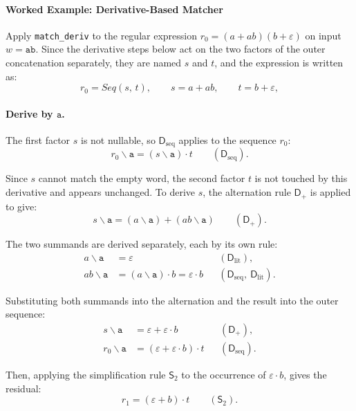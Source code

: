 \paragraph{Worked Example: Derivative-Based Matcher}
\label{sec:deriv-worked-example}

Apply \texttt{match\_deriv} to the regular expression
$r_0 = (a + ab)(b + \varepsilon)$ 
on input $w = \mathtt{ab}$. 
Since the derivative steps below act on the two factors 
of the outer concatenation separately, 
they are named $s$ and $t$, and the expression is written as:
\[
r_0 = \mathit{Seq}(s,\, t),
\qquad
s = a + ab,
\qquad
t = b + \varepsilon,
\]

\paragraph{Derive by $\mathtt{a}$.}
The first factor $s$ is not nullable, 
so $\mathsf{D}_{\mathrm{seq}}$ applies to the sequence $r_0$:
\[
r_0 \backslash \mathtt{a}
  = (s \backslash \mathtt{a}) \cdot t
  \qquad (\mathsf{D}_{\mathrm{seq}}).
\]

Since $s$ cannot match the empty word, 
the second factor $t$ is not touched by this derivative and appears unchanged. 
To derive $s$, the alternation rule $\mathsf{D}_{+}$ is applied to give:
\[
s \backslash \mathtt{a}
  = (a \backslash \mathtt{a}) + (ab \backslash \mathtt{a})
  \qquad (\mathsf{D}_{+}).
\]

The two summands are derived separately, each by its own rule:
\[
\begin{aligned}
a \backslash \mathtt{a}
  &= \varepsilon
  &&(\mathsf{D}_{\mathrm{lit}}), \\[2pt]
ab \backslash \mathtt{a}
  &= (a \backslash \mathtt{a}) \cdot b
   = \varepsilon \cdot b
  &&(\mathsf{D}_{\mathrm{seq}},\ \mathsf{D}_{\mathrm{lit}}).
\end{aligned}
\]

Substituting both summands into the alternation 
and the result into the outer sequence:
\[
\begin{aligned}
s \backslash \mathtt{a}
  &= \varepsilon + \varepsilon \cdot b
  &&(\mathsf{D}_{+}), \\[4pt]
r_0 \backslash \mathtt{a}
  &= (\varepsilon + \varepsilon \cdot b) \cdot t
  &&(\mathsf{D}_{\mathrm{seq}}).
\end{aligned}
\]

Then, applying the simplification rule $\mathsf{S}_{2}$ 
to the occurrence of $\varepsilon \cdot b$, gives the residual:
\[
r_1 = (\varepsilon + b) \cdot t
  \qquad (\mathsf{S}_{2}).
\]


